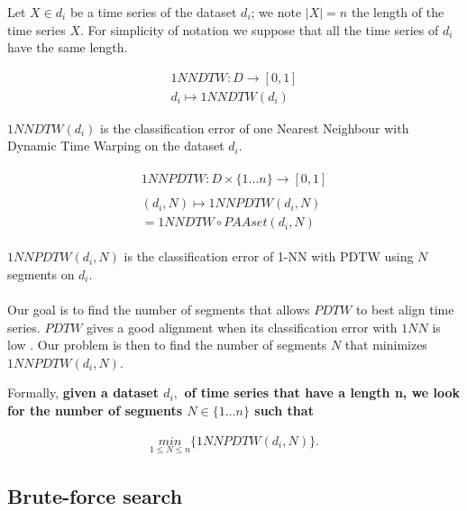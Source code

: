 Let $X \in d_i$ be a time series of the dataset $d_i$; we note $|X| = n$ the length of the time series $X$. For simplicity of notation we suppose that all the time series of $d_i$ have the same length.

\begin{definition}
\begin{eqnarray}
 1NNDTW: D \rightarrow [0, 1] \\
  d_i\mapsto 1NNDTW(d_i)
\end{eqnarray}


 $1NNDTW(d_i)$ is the classification error of one Nearest Neighbour with Dynamic Time Warping on the dataset $d_i$.
\end{definition}




\begin{definition}
\begin{eqnarray}
\begin{array}{l}
 1NNPDTW: D\times\{1 \ldots n\}\rightarrow [0, 1]\\
 \\
(d_i, N)\mapsto 1NNPDTW(d_i, N) \\
 =  1NNDTW \circ PAAset ( d_i, N) 
\end{array}
\end{eqnarray}
\end{definition}

$1NNPDTW( d_i, N)$  is the classification error of 1-NN with PDTW using $N$ segments on 
 $d_i$.

\paragraph{}Our goal is to find the number of segments that allows $PDTW$ to best align
time series.  $PDTW$ gives a good alignment when its
classification error with $1NN$ is low
\cite{Rakthanmanon_Campana_Mueen_Batista_Westover_Zhu_Zakaria_Keogh_2012}.  Our
problem is then to find the number of segments $N$ that minimizes $1NNPDTW(d_i,
N)$.

Formally, \textbf{ given a dataset $d_i,$ of time series that have a length n, we look for the number
of segments $N \in \{1 \ldots n \}$ such that}

\begin{eqnarray}
\underset{1\leq N\leq n}{min}\{1NNPDTW(d_i,N)\}.
\end{eqnarray}


\subsection{Brute-force search}

